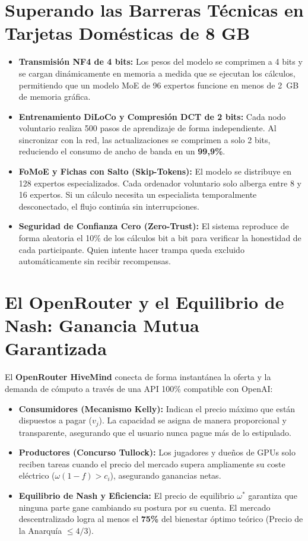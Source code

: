 \documentclass[11pt,a4paper]{report}
\begin{document}
\section{Superando las Barreras Técnicas en Tarjetas Domésticas de 8 GB}

\begin{itemize}[leftmargin=1.8em]
    \item \textbf{Transmisión NF4 de 4 bits:} Los pesos del modelo se comprimen a 4 bits y se cargan dinámicamente en memoria a medida que se ejecutan los cálculos, permitiendo que un modelo MoE de 96 expertos funcione en menos de 2~GB de memoria gráfica.
    \item \textbf{Entrenamiento DiLoCo y Compresión DCT de 2 bits:} Cada nodo voluntario realiza 500 pasos de aprendizaje de forma independiente. Al sincronizar con la red, las actualizaciones se comprimen a solo 2 bits, reduciendo el consumo de ancho de banda en un \textbf{99,9\%}.
    \item \textbf{FoMoE y Fichas con Salto (Skip-Tokens):} El modelo se distribuye en 128 expertos especializados. Cada ordenador voluntario solo alberga entre 8 y 16 expertos. Si un cálculo necesita un especialista temporalmente desconectado, el flujo continúa sin interrupciones.
    \item \textbf{Seguridad de Confianza Cero (Zero-Trust):} El sistema reproduce de forma aleatoria el 10\% de los cálculos bit a bit para verificar la honestidad de cada participante. Quien intente hacer trampa queda excluido automáticamente sin recibir recompensas.
\end{itemize}

\section{El OpenRouter y el Equilibrio de Nash: Ganancia Mutua Garantizada}

El \textbf{OpenRouter HiveMind} conecta de forma instantánea la oferta y la demanda de cómputo a través de una API 100\% compatible con OpenAI:
\begin{itemize}[leftmargin=1.8em]
    \item \textbf{Consumidores (Mecanismo Kelly):} Indican el precio máximo que están dispuestos a pagar ($v_j$). La capacidad se asigna de manera proporcional y transparente, asegurando que el usuario nunca pague más de lo estipulado.
    \item \textbf{Productores (Concurso Tullock):} Los jugadores y dueños de GPUs solo reciben tareas cuando el precio del mercado supera ampliamente su coste eléctrico ($\omega(1-f) > c_i$), asegurando ganancias netas.
    \item \textbf{Equilibrio de Nash y Eficiencia:} El precio de equilibrio $\omega^*$ garantiza que ninguna parte gane cambiando su postura por su cuenta. El mercado descentralizado logra al menos el \textbf{75\%} del bienestar óptimo teórico (Precio de la Anarquía $\le 4/3$).
\end{itemize}
\end{document}
